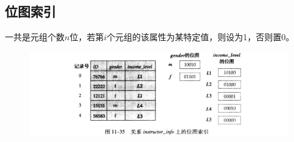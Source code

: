 \subsection{位图索引}
一共是元组个数$n$位，若第$i$个元组的该属性为某特定值，则设为1，否则置0。
\begin{figure}[H]
\centering
\includegraphics[width=0.9\linewidth]{fig/bitmap.png}
\end{figure}
